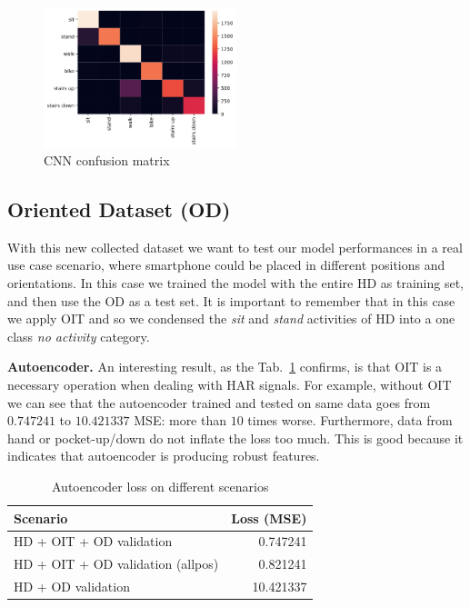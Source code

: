 \begin{figure}[h]
	\centering
	\includegraphics[width=0.5\textwidth]{images/confusion_matrix.png}
	\caption{CNN confusion matrix}
	\label{fig:cnn-confusion-matrix}
\end{figure}


\subsection{Oriented Dataset (OD)}

With this new collected dataset we want to test our model
performances in a real use case scenario, where smartphone could be
placed in different positions and orientations. In this case we
trained the model with the entire HD as training set, and then use the
OD as a test set. It is important to remember that in this case we apply OIT and so we condensed the \textit{sit} and \textit{stand} activities of HD into a one class \textit{no activity} category.

\textbf{Autoencoder.}  An interesting result, as the
Tab.~\ref{tab:ae-loss} confirms, is that OIT is a necessary operation
when dealing with HAR signals. For example, without OIT we can see
that the autoencoder trained and tested on same data goes from
$0.747241$ to $10.421337$ MSE: more than $10$ times worse. Furthermore,
data from hand or pocket-up/down do not inflate the loss too
much. This is good because it indicates that autoencoder is producing
robust features.

\begin{table}[h]
  \centering
  \begin{tabular}{lr}
    \hline
    Scenario & Loss (MSE) \\
    \hline
    HD + OIT + OD validation & 0.747241 \\
    HD + OIT + OD validation (allpos) & 0.821241 \\
    HD + OD validation & 10.421337 \\
    \hline
  \end{tabular}
  \caption{Autoencoder loss on different scenarios}
  \label{tab:ae-loss}
\end{table}

